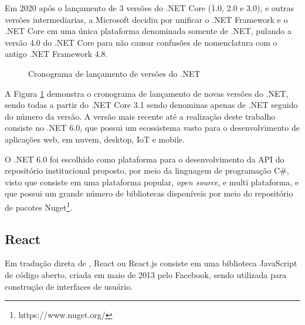 Em 2020 após o lançamento de 3 versões do .NET Core (1.0, 2.0 e 3.0), e outras
versões intermediarias, a Microsoft decidiu por unificar o .NET Framework e o
.NET Core em uma única plataforma denominada somente de .NET, pulando a
versão 4.0 do .NET Core para não causar confusões de nomenclatura
com o antigo .NET Framework 4.8.

\begin{figure}[H]
    \caption{Cronograma de lançamento de versões do .NET}
    \centering
    \label{fig:dotnet-release-schedule}
\end{figure}

A Figura \ref{fig:dotnet-release-schedule} demonstra o cronograma de lançamento
de novas versões do .NET, sendo todas a partir do .NET Core 3.1 sendo denominas
apenas de .NET seguido do número da versão. A versão mais recente até a
realização deste trabalho consiste no .NET 6.0, que possui um ecossistema
vasto para o desenvolvimento de aplicações web, em nuvem, desktop, IoT
e mobile.

O .NET 6.0 foi escolhido como plataforma para o desenvolvimento da API do
repositório institucional proposto, por meio da linguagem de programação C\#,
visto que consiste em uma plataforma popular, \emph{open source}, e multi
plataforma, e que possui um grande número de bibliotecas disponíveis
por meio do repositório de pacotes Nuget\footnote{https://www.nuget.org/}.

\subsection{React}

Em tradução direta de \citep[p. 30]{Thakkar:2020}, React ou React.js consiste em uma
biblioteca JavaScript de código aberto, criada em maio de 2013 pelo Facebook,
sendo utilizada para construção de interfaces de usuário.

